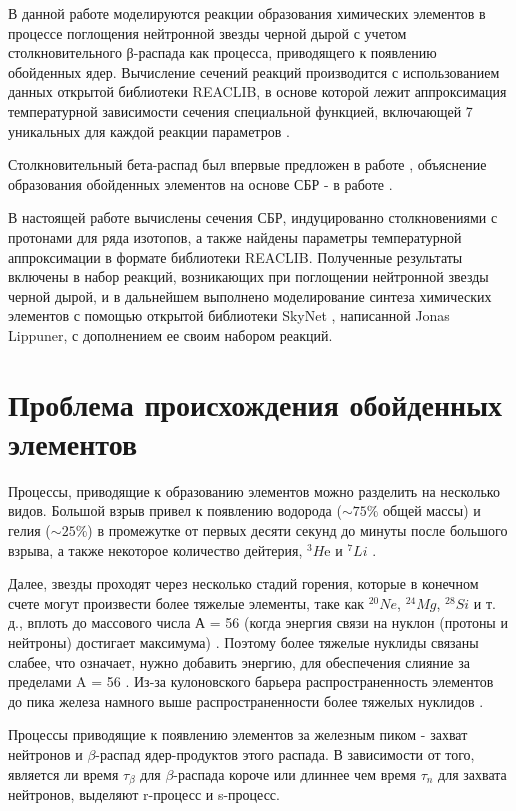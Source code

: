 \documentclass[14pt, a4paper]{article}
\begin{document}
В данной работе моделируются реакции образования химических элементов в процессе поглощения нейтронной звезды черной дырой \cite{bhns1} с учетом столкновительного β-распада как процесса, приводящего к появлению обойденных ядер. Вычисление сечений реакций производится с использованием данных открытой библиотеки REACLIB, в основе которой лежит аппроксимация температурной зависимости сечения специальной функцией, включающей 7 уникальных для каждой реакции параметров \cite{jina}.

Столкновительный бета-распад был впервые предложен в работе \cite{batkin}, объяснение образования обойденных элементов на
основе СБР - в работе \cite{tak}.

В настоящей работе вычислены сечения СБР, индуцированно столкновениями с протонами для ряда изотопов, а также найдены параметры температурной аппроксимации в формате библиотеки REACLIB. Полученные результаты включены в набор реакций, возникающих при поглощении нейтронной звезды черной дырой, и в дальнейшем выполнено моделирование синтеза химических элементов с помощью открытой библиотеки SkyNet \cite{skynet}, написанной Jonas Lippuner, с дополнением ее своим набором реакций.


\section{Проблема происхождения обойденных элементов}

Процессы, приводящие к образованию элементов можно разделить на несколько видов. Большой взрыв привел к появлению водорода ($\sim75\%$ общей массы) и гелия ($\sim25\%$) в промежутке от первых десяти секунд до минуты после большого взрыва, а также некоторое количество дейтерия, $^3H$e и $^7Li$ \cite{Tytler}.
 
 Далее, звезды проходят через несколько стадий горения, которые в конечном счете могут произвести более тяжелые элементы, таке как $^{20}Ne$, $^{24}Mg$, $^{28}Si$ и т. д., вплоть до массового числа А = 56 (когда энергия связи на нуклон (протоны и нейтроны) достигает максимума) \cite{cauldrons, energy, interiors}. Поэтому более тяжелые нуклиды связаны слабее, что означает, нужно добавить энергию, для обеспечения слияние за пределами A = 56 \cite{cauldrons, qse, massive}. Из-за кулоновского барьера распространенность элементов до пика железа намного выше распространенности более тяжелых нуклидов \cite{iron-abu}.
 
 Процессы приводящие к появлению элементов за железным пиком  - захват нейтронов \cite{cauldrons} и $\beta$-распад ядер-продуктов этого распада. В зависимости от того, является ли время $\tau_\beta$ для $\beta$-распада короче или длиннее чем время $\tau_n$ для захвата нейтронов, выделяют r-процесс и s-процесс.
 
\end{document}

